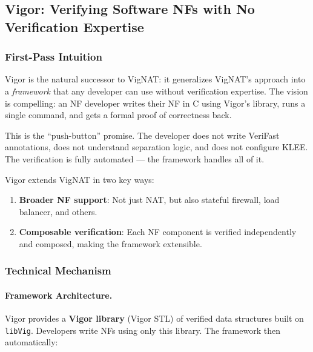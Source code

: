 \subsection{Vigor: Verifying Software NFs with No Verification Expertise}

\subsubsection{First-Pass Intuition}

Vigor is the natural successor to VigNAT: it generalizes VigNAT's approach into a \emph{framework} that any developer can use without verification expertise. The vision is compelling: an NF developer writes their NF in C using Vigor's library, runs a single command, and gets a formal proof of correctness back.

This is the ``push-button'' promise. The developer does not write VeriFast annotations, does not understand separation logic, and does not configure KLEE. The verification is fully automated --- the framework handles all of it.

Vigor extends VigNAT in two key ways:
\begin{enumerate}
  \item \textbf{Broader NF support}: Not just NAT, but also stateful firewall, load balancer, and others.
  \item \textbf{Composable verification}: Each NF component is verified independently and composed, making the framework extensible.
\end{enumerate}

\subsubsection{Technical Mechanism}

\paragraph{Framework Architecture.}
Vigor provides a \textbf{Vigor library} (Vigor STL) of verified data structures built on \texttt{libVig}. Developers write NFs using only this library. The framework then automatically:

